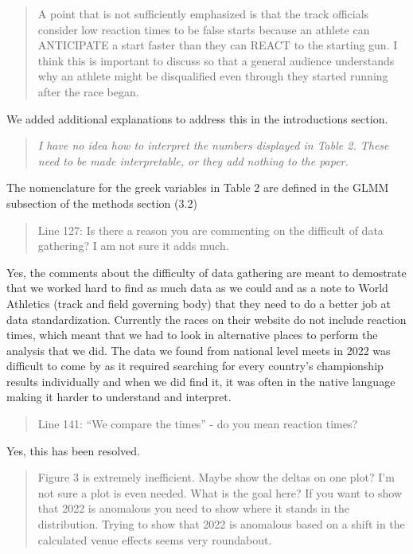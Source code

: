 \documentclass[12pt]{article}
\newenvironment{comment}%
{\begin{quotation}\noindent\small\it\color{darkblue}\ignorespaces%
}{\end{quotation}}
\begin{document}
\begin{comment}
A point that is not sufficiently emphasized is that the track officials consider
low reaction times to be false starts because an athlete can ANTICIPATE a start
faster than they can REACT to the starting gun. I think this is important to
discuss so that a general audience understands why an athlete might be
disqualified even through they started running after the race began.  
\end{comment}

We added additional explanations to address this in the introductions section.

\begin{comment}I have no idea how to interpret the numbers displayed in Table 2. These
need to be made interpretable, or they add nothing to the paper.
\end{comment}

The nomenclature for the greek variables in Table 2 are defined in the GLMM
subsection of the methods section (3.2)

\begin{comment}
Line 127: Is there a reason you are commenting on the difficult of data
gathering? I am not sure it adds much.
\end{comment}

Yes, the comments about the difficulty of data gathering are meant to demostrate
that we worked hard to find as much data as we could and as a note to World
Athletics (track and field governing body) that they need to do a better job
at data standardization.  Currently the races on their website do not include
reaction times, which meant that we had to look in alternative places to perform
the analysis that we did.  The data we found from national level meets in 2022
was difficult to come by as it required searching for every country's championship
results individually and when we did find it, it was often in the native language
making it harder to understand and interpret.

\begin{comment}
Line 141: “We compare the times” - do you mean reaction times?
\end{comment}

Yes, this has been resolved.

\begin{comment}
Figure 3 is extremely inefficient. Maybe show the deltas on one plot? I'm not
sure a plot is even needed. What is the goal here? If you want to show that 2022
is anomalous you need to show where it stands in the distribution. Trying to
show that 2022 is anomalous based on a shift in the calculated venue effects
seems very roundabout.
\end{comment}
\end{document}
